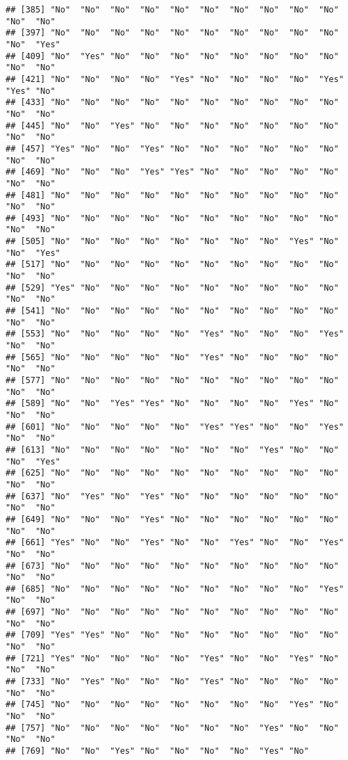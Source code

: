 \documentclass[
]{article}
\begin{document}
\begin{verbatim}
## [385] "No"  "No"  "No"  "No"  "No"  "No"  "No"  "No"  "No"  "No"  "No"  "No" 
## [397] "No"  "No"  "No"  "No"  "No"  "No"  "No"  "No"  "No"  "No"  "No"  "Yes"
## [409] "No"  "Yes" "No"  "No"  "No"  "No"  "No"  "No"  "No"  "No"  "No"  "No" 
## [421] "No"  "No"  "No"  "No"  "Yes" "No"  "No"  "No"  "No"  "Yes" "Yes" "No" 
## [433] "No"  "No"  "No"  "No"  "No"  "No"  "No"  "No"  "No"  "No"  "No"  "No" 
## [445] "No"  "No"  "Yes" "No"  "No"  "No"  "No"  "No"  "No"  "No"  "No"  "No" 
## [457] "Yes" "No"  "No"  "Yes" "No"  "No"  "No"  "No"  "No"  "No"  "No"  "No" 
## [469] "No"  "No"  "No"  "Yes" "Yes" "No"  "No"  "No"  "No"  "No"  "No"  "No" 
## [481] "No"  "No"  "No"  "No"  "No"  "No"  "No"  "No"  "No"  "No"  "No"  "No" 
## [493] "No"  "No"  "No"  "No"  "No"  "No"  "No"  "No"  "No"  "No"  "No"  "No" 
## [505] "No"  "No"  "No"  "No"  "No"  "No"  "No"  "No"  "Yes" "No"  "No"  "Yes"
## [517] "No"  "No"  "No"  "No"  "No"  "No"  "No"  "No"  "No"  "No"  "No"  "No" 
## [529] "Yes" "No"  "No"  "No"  "No"  "No"  "No"  "No"  "No"  "No"  "No"  "No" 
## [541] "No"  "No"  "No"  "No"  "No"  "No"  "No"  "No"  "No"  "No"  "No"  "No" 
## [553] "No"  "No"  "No"  "No"  "No"  "Yes" "No"  "No"  "No"  "Yes" "No"  "No" 
## [565] "No"  "No"  "No"  "No"  "No"  "Yes" "No"  "No"  "No"  "No"  "No"  "No" 
## [577] "No"  "No"  "No"  "No"  "No"  "No"  "No"  "No"  "No"  "No"  "No"  "No" 
## [589] "No"  "No"  "Yes" "Yes" "No"  "No"  "No"  "No"  "Yes" "No"  "No"  "No" 
## [601] "No"  "No"  "No"  "No"  "No"  "Yes" "Yes" "No"  "No"  "Yes" "No"  "No" 
## [613] "No"  "No"  "No"  "No"  "No"  "No"  "No"  "Yes" "No"  "No"  "No"  "Yes"
## [625] "No"  "No"  "No"  "No"  "No"  "No"  "No"  "No"  "No"  "No"  "No"  "No" 
## [637] "No"  "Yes" "No"  "Yes" "No"  "No"  "No"  "No"  "No"  "No"  "No"  "No" 
## [649] "No"  "No"  "No"  "Yes" "No"  "No"  "No"  "No"  "No"  "No"  "No"  "No" 
## [661] "Yes" "No"  "No"  "Yes" "No"  "No"  "Yes" "No"  "No"  "Yes" "No"  "No" 
## [673] "No"  "No"  "No"  "No"  "No"  "No"  "No"  "No"  "No"  "No"  "No"  "No" 
## [685] "No"  "No"  "No"  "No"  "No"  "No"  "No"  "No"  "No"  "Yes" "No"  "No" 
## [697] "No"  "No"  "No"  "No"  "No"  "No"  "No"  "No"  "No"  "No"  "No"  "No" 
## [709] "Yes" "Yes" "No"  "No"  "No"  "No"  "No"  "No"  "No"  "No"  "No"  "No" 
## [721] "Yes" "No"  "No"  "No"  "No"  "Yes" "No"  "No"  "Yes" "No"  "No"  "No" 
## [733] "No"  "Yes" "No"  "No"  "No"  "Yes" "No"  "No"  "No"  "No"  "No"  "No" 
## [745] "No"  "No"  "No"  "No"  "No"  "No"  "No"  "No"  "Yes" "No"  "No"  "No" 
## [757] "No"  "No"  "No"  "No"  "No"  "No"  "No"  "Yes" "No"  "No"  "No"  "No" 
## [769] "No"  "No"  "Yes" "No"  "No"  "No"  "No"  "Yes" "No"
\end{verbatim}
\end{document}
